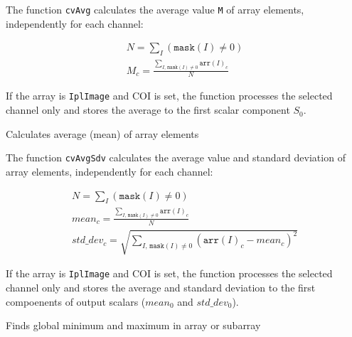 The function \texttt{cvAvg} calculates the average value \texttt{M} of array elements, independently for each channel:

\[
\begin{array}{l}
N = \sum_I (\texttt{mask}(I) \ne 0)\\
M_c = \frac{\sum_{ I, \, \texttt{mask}(I) \ne 0} \texttt{arr}(I)_c}{N}
\end{array}
\]

If the array is \texttt{IplImage} and COI is set, the function processes the selected channel only and stores the average to the first scalar component $S_0$.

\label{AvgSdv}

Calculates average (mean) of array elements


\begin{description}
\end{description}

The function \texttt{cvAvgSdv} calculates the average value and standard deviation of array elements, independently for each channel:

\[
\begin{array}{l}
N = \sum_I (\texttt{mask}(I) \ne 0)\\
mean_c = \frac{\sum_{ I, \, \texttt{mask}(I) \ne 0} \texttt{arr}(I)_c}{N}\\
std\_dev_c = \sqrt{\sum_{ I, \, \texttt{mask}(I) \ne 0} (\texttt{arr}(I)_c - mean_c)^2}
\end{array}
\]

If the array is \texttt{IplImage} and COI is set, the function processes the selected channel only and stores the average and standard deviation to the first compoenents of output scalars ($mean_0$ and $std\_dev_0$).

\label{MinMaxLoc}

Finds global minimum and maximum in array or subarray


